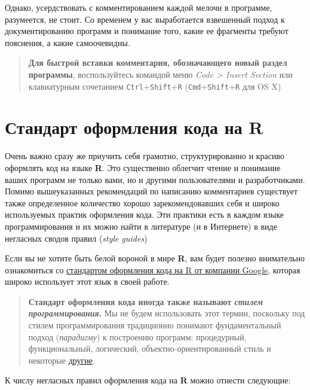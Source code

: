 \documentclass[]{book}
\begin{document}
Однако, усердствовать с комментированием каждой мелочи в программе,
разумеется, не стоит. Со временем у вас выработается взвешенный подход к
документированию программ и понимание того, какие ее фрагменты требуют
пояснения, а какие самоочевидны.

\begin{quote}
\textbf{Для быстрой вставки комментария, обозначающего новый раздел
программы}, воспользуйтесь командой меню \emph{Code \textgreater{}
Insert Section} или клавиатурным сочетанием
\texttt{Ctrl}+\texttt{Shift}+\texttt{R}
(\texttt{Cmd}+\texttt{Shift}+\texttt{R} для OS X)
\end{quote}

\section*{Стандарт оформления кода на R}\label{----r}

Очень важно сразу же приучить себя грамотно, структурированно и красиво
оформлять код на языке \textbf{R}. Это существенно облегчит чтение и
понимание ваших программ не только вами, но и другими пользователями и
разработчиками. Помимо вышеуказанных рекомендаций по написанию
комментариев существует также определенное количество хорошо
зарекомендовавших себя и широко используемых практик оформления кода.
Эти практики есть в каждом языке программирования и их можно найти в
литературе (и в Интернете) в виде негласных сводов правил (\emph{style
guides})

Если вы не хотите быть белой вороной в мире \textbf{R}, вам будет
полезно внимательно ознакомиться со
\href{https://google.github.io/styleguide/Rguide.xml\#filenames}{стандартом
оформления кода на R от компании Google}, которая широко использует этот
язык в своей работе.

\begin{quote}
\textbf{Стандарт оформления кода иногда также называют \emph{стилем
программирования}.} Мы не будем использовать этот термин, поскольку под
стилем программирования традиционно понимают фундаментальный подход
(\emph{парадигму}) к построению программ: процедурный, функциональный,
логический, объектно-ориентированный стиль и некоторые
\href{https://ru.wikipedia.org/wiki/Парадигма_программирования}{другие}.
\end{quote}

К числу негласных правил оформления кода на \textbf{R} можно отнести
следующие:
\end{document}
